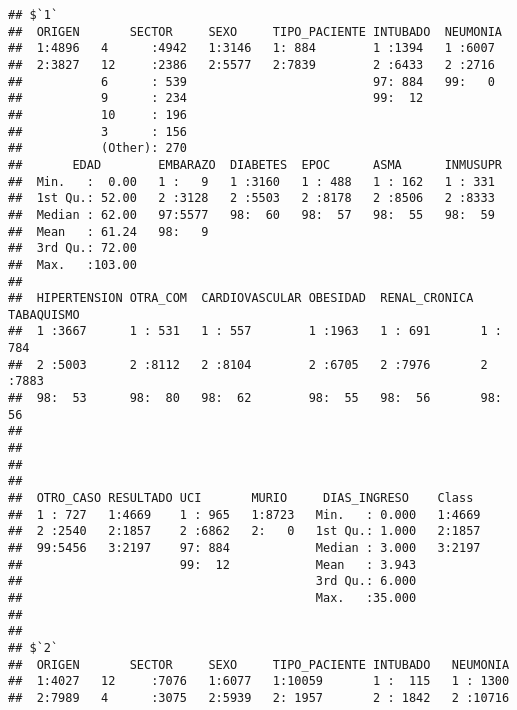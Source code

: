\documentclass[]{article}
\begin{document}
\begin{verbatim}
## $`1`
##  ORIGEN       SECTOR     SEXO     TIPO_PACIENTE INTUBADO  NEUMONIA 
##  1:4896   4      :4942   1:3146   1: 884        1 :1394   1 :6007  
##  2:3827   12     :2386   2:5577   2:7839        2 :6433   2 :2716  
##           6      : 539                          97: 884   99:   0  
##           9      : 234                          99:  12            
##           10     : 196                                             
##           3      : 156                                             
##           (Other): 270                                             
##       EDAD        EMBARAZO  DIABETES  EPOC      ASMA      INMUSUPR 
##  Min.   :  0.00   1 :   9   1 :3160   1 : 488   1 : 162   1 : 331  
##  1st Qu.: 52.00   2 :3128   2 :5503   2 :8178   2 :8506   2 :8333  
##  Median : 62.00   97:5577   98:  60   98:  57   98:  55   98:  59  
##  Mean   : 61.24   98:   9                                          
##  3rd Qu.: 72.00                                                    
##  Max.   :103.00                                                    
##                                                                    
##  HIPERTENSION OTRA_COM  CARDIOVASCULAR OBESIDAD  RENAL_CRONICA TABAQUISMO
##  1 :3667      1 : 531   1 : 557        1 :1963   1 : 691       1 : 784   
##  2 :5003      2 :8112   2 :8104        2 :6705   2 :7976       2 :7883   
##  98:  53      98:  80   98:  62        98:  55   98:  56       98:  56   
##                                                                          
##                                                                          
##                                                                          
##                                                                          
##  OTRO_CASO RESULTADO UCI       MURIO     DIAS_INGRESO    Class   
##  1 : 727   1:4669    1 : 965   1:8723   Min.   : 0.000   1:4669  
##  2 :2540   2:1857    2 :6862   2:   0   1st Qu.: 1.000   2:1857  
##  99:5456   3:2197    97: 884            Median : 3.000   3:2197  
##                      99:  12            Mean   : 3.943           
##                                         3rd Qu.: 6.000           
##                                         Max.   :35.000           
##                                                                  
## 
## $`2`
##  ORIGEN       SECTOR     SEXO     TIPO_PACIENTE INTUBADO   NEUMONIA  
##  1:4027   12     :7076   1:6077   1:10059       1 :  115   1 : 1300  
##  2:7989   4      :3075   2:5939   2: 1957       2 : 1842   2 :10716  

\end{verbatim}
\end{document}
